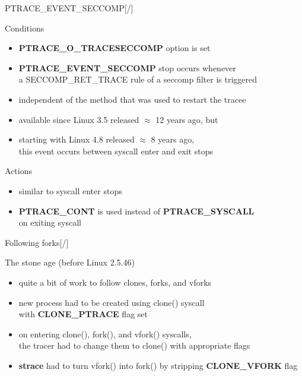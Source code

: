 \documentclass[unicode,aspectratio=169,xcolor={table,dvipsnames,usenames}]{beamer}
\begin{document}
\begin{frame}{\Large PTRACE\_EVENT\_SECCOMP\hfill [\insertframenumber/\inserttotalframenumber]}
\large
\begin{block}{Conditions}
\begin{itemize}
	\item \textbf{PTRACE\_O\_TRACESECCOMP} option is set
	\item \textbf{PTRACE\_EVENT\_SECCOMP} stop occurs whenever \\
		a SECCOMP\_RET\_TRACE rule of a seccomp filter is triggered
	\item independent of the method that was used to restart the tracee
	\item available since Linux 3.5 released $\approx$ 12 years ago, but
	\item starting with Linux 4.8 released $\approx$ 8 years ago, \\
	       this event occurs between syscall enter and exit stops
\end{itemize}
\end{block}

\begin{block}{Actions}
\begin{itemize}
	\item similar to syscall enter stops
	\item \textbf{PTRACE\_CONT} is used instead of \textbf{PTRACE\_SYSCALL} \\
		on exiting syscall
\end{itemize}
\end{block}
\end{frame}

\begin{frame}{\Large Following forks\hfill [\insertframenumber/\inserttotalframenumber]}
\large
\begin{block}{The stone age (before Linux 2.5.46)}
\begin{itemize}
	\item quite a bit of work to follow clones, forks, and vforks
	\item new process had to be created using clone() syscall \\
		with \textbf{CLONE\_PTRACE} flag set
	\item on entering clone(), fork(), and vfork() syscalls, \\
		the tracer had to change them to clone() with appropriate flags
	\item \textbf{strace} had to turn vfork() into fork() by stripping \textbf{CLONE\_VFORK} flag
\end{itemize}
\end{block}
\end{frame}
\end{document}

